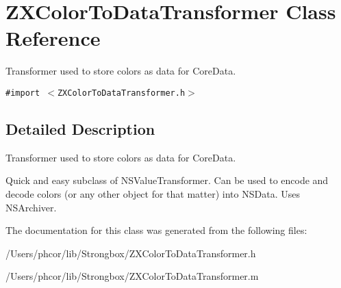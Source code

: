 \hypertarget{interface_z_x_color_to_data_transformer}{
\section{ZXColorToDataTransformer Class Reference}
\label{interface_z_x_color_to_data_transformer}
}
Transformer used to store colors as data for CoreData.  


{\tt \#import $<$ZXColorToDataTransformer.h$>$}



\subsection{Detailed Description}
Transformer used to store colors as data for CoreData. 

Quick and easy subclass of NSValueTransformer. Can be used to encode and decode colors (or any other object for that matter) into NSData. Uses NSArchiver. 

The documentation for this class was generated from the following files:\begin{CompactItemize}
\item 
/Users/phcor/lib/Strongbox/ZXColorToDataTransformer.h\item 
/Users/phcor/lib/Strongbox/ZXColorToDataTransformer.m\end{CompactItemize}
